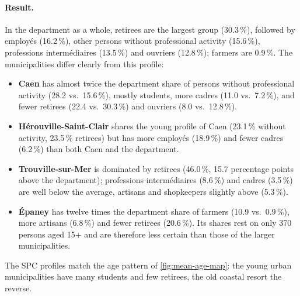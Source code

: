 \paragraph{Result.}
In the department as a whole, retirees are the largest group (30.3\,\%), followed by employ\'es (16.2\,\%), other
persons without professional activity (15.6\,\%), professions interm\'ediaires (13.5\,\%) and ouvriers (12.8\,\%);
farmers are 0.9\,\%. The municipalities differ clearly from this profile:
\begin{itemize}
  \item \textbf{Caen} has almost twice the department share of persons without professional activity (28.2 vs.\
  15.6\,\%), mostly students, more cadres (11.0 vs.\ 7.2\,\%), and fewer retirees (22.4 vs.\ 30.3\,\%) and ouvriers
  (8.0 vs.\ 12.8\,\%).
  \item \textbf{H\'erouville-Saint-Clair} shares the young profile of Caen (23.1\,\% without activity, 23.5\,\%
  retirees) but has more employ\'es (18.9\,\%) and fewer cadres (6.2\,\%) than both Caen and the department.
  \item \textbf{Trouville-sur-Mer} is dominated by retirees (46.0\,\%, 15.7 percentage points above the department);
  professions interm\'ediaires (8.6\,\%) and cadres (3.5\,\%) are well below the average, artisans and shopkeepers
  slightly above (5.3\,\%).
  \item \textbf{\'Epaney} has twelve times the department share of farmers (10.9 vs.\ 0.9\,\%), more artisans
  (6.8\,\%) and fewer retirees (20.6\,\%). Its shares rest on only 370 persons aged 15+ and are therefore less certain
  than those of the larger municipalities.
\end{itemize}
The SPC profiles match the age pattern of \cref{fig:mean-age-map}: the young urban municipalities have many students and
few retirees, the old coastal resort the reverse.

